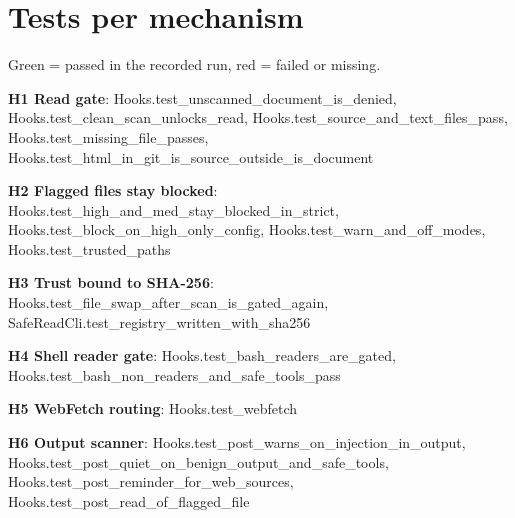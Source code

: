 \documentclass[10pt,a4paper]{article}
\begin{document}
\section{Tests per mechanism}
Green = passed in the recorded run, red = failed or missing.\par
\footnotesize\raggedright
\textbf{H1 Read gate}: \textcolor{ok}{Hooks.\allowbreak{}test\_\allowbreak{}unscanned\_\allowbreak{}document\_\allowbreak{}is\_\allowbreak{}denied}, \textcolor{ok}{Hooks.\allowbreak{}test\_\allowbreak{}clean\_\allowbreak{}scan\_\allowbreak{}unlocks\_\allowbreak{}read}, \textcolor{ok}{Hooks.\allowbreak{}test\_\allowbreak{}source\_\allowbreak{}and\_\allowbreak{}text\_\allowbreak{}files\_\allowbreak{}pass}, \textcolor{ok}{Hooks.\allowbreak{}test\_\allowbreak{}missing\_\allowbreak{}file\_\allowbreak{}passes}, \textcolor{ok}{Hooks.\allowbreak{}test\_\allowbreak{}html\_\allowbreak{}in\_\allowbreak{}git\_\allowbreak{}is\_\allowbreak{}source\_\allowbreak{}outside\_\allowbreak{}is\_\allowbreak{}document}\par
\textbf{H2 Flagged files stay blocked}: \textcolor{ok}{Hooks.\allowbreak{}test\_\allowbreak{}high\_\allowbreak{}and\_\allowbreak{}med\_\allowbreak{}stay\_\allowbreak{}blocked\_\allowbreak{}in\_\allowbreak{}strict}, \textcolor{ok}{Hooks.\allowbreak{}test\_\allowbreak{}block\_\allowbreak{}on\_\allowbreak{}high\_\allowbreak{}only\_\allowbreak{}config}, \textcolor{ok}{Hooks.\allowbreak{}test\_\allowbreak{}warn\_\allowbreak{}and\_\allowbreak{}off\_\allowbreak{}modes}, \textcolor{ok}{Hooks.\allowbreak{}test\_\allowbreak{}trusted\_\allowbreak{}paths}\par
\textbf{H3 Trust bound to SHA-256}: \textcolor{ok}{Hooks.\allowbreak{}test\_\allowbreak{}file\_\allowbreak{}swap\_\allowbreak{}after\_\allowbreak{}scan\_\allowbreak{}is\_\allowbreak{}gated\_\allowbreak{}again}, \textcolor{ok}{SafeReadCli.\allowbreak{}test\_\allowbreak{}registry\_\allowbreak{}written\_\allowbreak{}with\_\allowbreak{}sha256}\par
\textbf{H4 Shell reader gate}: \textcolor{ok}{Hooks.\allowbreak{}test\_\allowbreak{}bash\_\allowbreak{}readers\_\allowbreak{}are\_\allowbreak{}gated}, \textcolor{ok}{Hooks.\allowbreak{}test\_\allowbreak{}bash\_\allowbreak{}non\_\allowbreak{}readers\_\allowbreak{}and\_\allowbreak{}safe\_\allowbreak{}tools\_\allowbreak{}pass}\par
\textbf{H5 WebFetch routing}: \textcolor{ok}{Hooks.\allowbreak{}test\_\allowbreak{}webfetch}\par
\textbf{H6 Output scanner}: \textcolor{ok}{Hooks.\allowbreak{}test\_\allowbreak{}post\_\allowbreak{}warns\_\allowbreak{}on\_\allowbreak{}injection\_\allowbreak{}in\_\allowbreak{}output}, \textcolor{ok}{Hooks.\allowbreak{}test\_\allowbreak{}post\_\allowbreak{}quiet\_\allowbreak{}on\_\allowbreak{}benign\_\allowbreak{}output\_\allowbreak{}and\_\allowbreak{}safe\_\allowbreak{}tools}, \textcolor{ok}{Hooks.\allowbreak{}test\_\allowbreak{}post\_\allowbreak{}reminder\_\allowbreak{}for\_\allowbreak{}web\_\allowbreak{}sources}, \textcolor{ok}{Hooks.\allowbreak{}test\_\allowbreak{}post\_\allowbreak{}read\_\allowbreak{}of\_\allowbreak{}flagged\_\allowbreak{}file}\par
\end{document}
